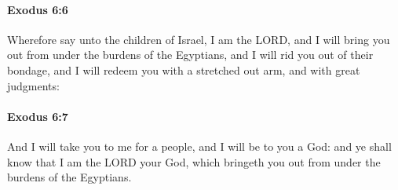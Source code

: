 		\paragraph{Exodus 6:6} %
			\label{EXODUS-6-6}

			Wherefore say unto the children of Israel, I am the LORD, and I will bring you out from under the burdens of the Egyptians, and I will rid you out of their bondage, and I will redeem you with a stretched out arm, and with great judgments:


		\paragraph{Exodus 6:7} %
			\label{EXODUS-6-7}

			And I will take you to me for a people, and I will be to you a God: and ye shall know that I am the LORD your God, which bringeth you out from under the burdens of the Egyptians.

